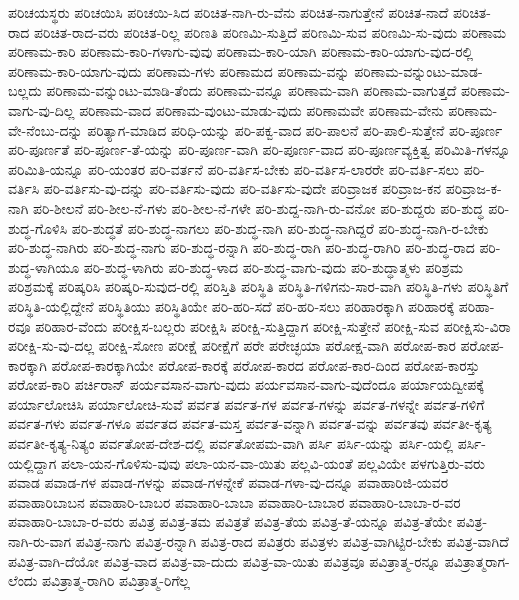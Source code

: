 {ಪರಿಚಯಸ್ಥರು
ಪರಿಚಯಿಸಿ
ಪರಿಚಯಿ-ಸಿದ
ಪರಿಚಿತ-ನಾಗಿ-ರು-ವೆನು
ಪರಿಚಿತ-ನಾಗುತ್ತೇನೆ
ಪರಿಚಿತ-ನಾದೆ
ಪರಿಚಿತ-ರಾದ
ಪರಿಚಿತ-ರಾದ-ವರು
ಪರಿಚಿತ-ರಿಲ್ಲ
ಪರಿಣತಿ
ಪರಿಣಮಿ-ಸುತ್ತಿದೆ
ಪರಿಣಮಿ-ಸುವ
ಪರಿಣಮಿ-ಸು-ವುದು
ಪರಿಣಾಮ
ಪರಿಣಾಮ-ಕಾರಿ
ಪರಿಣಾಮ-ಕಾರಿ-ಗಳಾಗು-ವುವು
ಪರಿಣಾಮ-ಕಾರಿ-ಯಾಗಿ
ಪರಿಣಾಮ-ಕಾರಿ-ಯಾಗು-ವುದ-ರಲ್ಲಿ
ಪರಿಣಾಮ-ಕಾರಿ-ಯಾಗು-ವುದು
ಪರಿಣಾಮ-ಗಳು
ಪರಿಣಾಮದ
ಪರಿಣಾಮ-ವನ್ನು
ಪರಿಣಾಮ-ವನ್ನುಂಟು-ಮಾಡ-ಬಲ್ಲದು
ಪರಿಣಾಮ-ವನ್ನುಂಟು-ಮಾಡಿ-ತೆಂದು
ಪರಿಣಾಮ-ವನ್ನೂ
ಪರಿಣಾಮ-ವಾಗಿ
ಪರಿಣಾಮ-ವಾಗುತ್ತದೆ
ಪರಿಣಾಮ-ವಾಗು-ವು-ದಿಲ್ಲ
ಪರಿಣಾಮ-ವಾದ
ಪರಿಣಾಮ-ವುಂಟು-ಮಾಡು-ವುದು
ಪರಿಣಾಮವೇ
ಪರಿಣಾಮ-ವೇನು
ಪರಿಣಾಮ-ವೇ-ನೆಂಬು-ದನ್ನು
ಪರಿತ್ಯಾಗ-ಮಾಡಿದ
ಪರಿಧಿ-ಯನ್ನು
ಪರಿ-ಪಕ್ವ-ವಾದ
ಪರಿ-ಪಾಲನೆ
ಪರಿ-ಪಾಲಿ-ಸುತ್ತೇನೆ
ಪರಿ-ಪೂರ್ಣ
ಪರಿ-ಪೂರ್ಣತೆ
ಪರಿ-ಪೂರ್ಣ-ತೆ-ಯನ್ನು
ಪರಿ-ಪೂರ್ಣ-ವಾಗಿ
ಪರಿ-ಪೂರ್ಣ-ವಾದ
ಪರಿ-ಪೂರ್ಣವ್ಯಕ್ತಿತ್ವ
ಪರಿಮಿತಿ-ಗಳನ್ನೂ
ಪರಿಮಿತಿ-ಯನ್ನೂ
ಪರಿ-ಯಂತರ
ಪರಿ-ವರ್ತನೆ
ಪರಿ-ವರ್ತಿಸ-ಬೇಕು
ಪರಿ-ವರ್ತಿಸ-ಲಾರರೇ
ಪರಿ-ವರ್ತಿ-ಸಲು
ಪರಿ-ವರ್ತಿಸಿ
ಪರಿ-ವರ್ತಿಸು-ವು-ದನ್ನು
ಪರಿ-ವರ್ತಿಸು-ವುದು
ಪರಿ-ವರ್ತಿಸು-ವುದೇ
ಪರಿವ್ರಾಜಕ
ಪರಿವ್ರಾಜ-ಕನ
ಪರಿವ್ರಾಜ-ಕ-ನಾಗಿ
ಪರಿ-ಶೀಲನೆ
ಪರಿ-ಶೀಲ-ನೆ-ಗಳು
ಪರಿ-ಶೀಲ-ನೆ-ಗಳೇ
ಪರಿ-ಶುದ್ದ-ನಾಗಿ-ರು-ವನೋ
ಪರಿ-ಶುದ್ದರು
ಪರಿ-ಶುದ್ಧ
ಪರಿ-ಶುದ್ಧ-ಗೊಳಿಸಿ
ಪರಿ-ಶುದ್ಧತೆ
ಪರಿ-ಶುದ್ಧ-ನಾಗಲು
ಪರಿ-ಶುದ್ಧ-ನಾಗಿ
ಪರಿ-ಶುದ್ಧ-ನಾಗಿದ್ದರೆ
ಪರಿ-ಶುದ್ಧ-ನಾಗಿ-ರ-ಬೇಕು
ಪರಿ-ಶುದ್ಧ-ನಾಗಿರು
ಪರಿ-ಶುದ್ಧ-ನಾಗು
ಪರಿ-ಶುದ್ಧ-ರನ್ನಾಗಿ
ಪರಿ-ಶುದ್ಧ-ರಾಗಿ
ಪರಿ-ಶುದ್ಧ-ರಾಗಿರಿ
ಪರಿ-ಶುದ್ಧ-ರಾದ
ಪರಿ-ಶುದ್ಧ-ಳಾಗಿಯೂ
ಪರಿ-ಶುದ್ಧ-ಳಾಗಿರು
ಪರಿ-ಶುದ್ಧ-ಳಾದ
ಪರಿ-ಶುದ್ಧ-ವಾಗು-ವುದು
ಪರಿ-ಶುದ್ಧಾತ್ಮಳು
ಪರಿಶ್ರಮ
ಪರಿಶ್ರಮಕ್ಕೆ
ಪರಿಷ್ಕರಿಸಿ
ಪರಿಷ್ಕರಿ-ಸುವುದ-ರಲ್ಲಿ
ಪರಿಸ್ತಿತಿ
ಪರಿಸ್ಥಿತಿ
ಪರಿಸ್ಥಿತಿ-ಗಳಿಗನು-ಸಾರ-ವಾಗಿ
ಪರಿಸ್ಥಿತಿ-ಗಳು
ಪರಿಸ್ಥಿತಿಗೆ
ಪರಿಸ್ಥಿತಿ-ಯಲ್ಲಿದ್ದೇನೆ
ಪರಿಸ್ಥಿತಿಯು
ಪರಿಸ್ಥಿತಿಯೇ
ಪರಿ-ಹರಿ-ಸದೆ
ಪರಿ-ಹರಿ-ಸಲು
ಪರಿಹಾರಕ್ಕಾಗಿ
ಪರಿಹಾರಕ್ಕೆ
ಪರಿಹಾ-ರವೂ
ಪರಿಹಾರ-ವೆಂದು
ಪರೀಕ್ಷಿಸ-ಬಲ್ಲರು
ಪರೀಕ್ಷಿಸಿ
ಪರೀಕ್ಷಿ-ಸುತ್ತಿದ್ದಾಗ
ಪರೀಕ್ಷಿ-ಸುತ್ತೇನೆ
ಪರೀಕ್ಷಿ-ಸುವ
ಪರೀಕ್ಷಿಸು-ವಿರಾ
ಪರೀಕ್ಷಿ-ಸು-ವು-ದಲ್ಲ
ಪರೀಕ್ಷಿ-ಸೋಣ
ಪರೀಕ್ಷೆ
ಪರೀಕ್ಷೆಗೆ
ಪರೇ
ಪರೇಚ್ಛಯಾ
ಪರೋಕ್ಷ-ವಾಗಿ
ಪರೋಪ-ಕಾರ
ಪರೋಪ-ಕಾರಕ್ಕಾಗಿ
ಪರೋಪ-ಕಾರಕ್ಕಾಗಿಯೇ
ಪರೋಪ-ಕಾರಕ್ಕೆ
ಪರೋಪ-ಕಾರದ
ಪರೋಪ-ಕಾರ-ದಿಂದ
ಪರೋಪ-ಕಾರಸ್ತು
ಪರೋಪ-ಕಾರಿ
ಪರ್ಚಿರಾನ್
ಪರ್ಯವಸಾನ-ವಾಗು-ವುದು
ಪರ್ಯವಸಾನ-ವಾಗು-ವುದೆಂದೂ
ಪರ್ಯಾಯದ್ವೀಪಕ್ಕೆ
ಪರ್ಯಾಲೋಚಿಸಿ
ಪರ್ಯಾಲೋಚಿ-ಸುವೆ
ಪರ್ವತ
ಪರ್ವತ-ಗಳ
ಪರ್ವತ-ಗಳನ್ನು
ಪರ್ವತ-ಗಳನ್ನೇ
ಪರ್ವತ-ಗಳಿಗೆ
ಪರ್ವತ-ಗಳು
ಪರ್ವತ-ಗಳೂ
ಪರ್ವತದ
ಪರ್ವತ-ಮಸ್ತ
ಪರ್ವತ-ವನ್ನಾಗಿ
ಪರ್ವತ-ವನ್ನು
ಪರ್ವತವು
ಪರ್ವತೀ-ಕೃತ್ಯ
ಪರ್ವತೀ-ಕೃತ್ಯ-ನಿತ್ಯಂ
ಪರ್ವತೋಪ-ದೇಶ-ದಲ್ಲಿ
ಪರ್ವತೋಪಮ-ವಾಗಿ
ಪರ್ಸಿ
ಪರ್ಸಿ-ಯನ್ನು
ಪರ್ಸಿ-ಯಲ್ಲಿ
ಪರ್ಸಿ-ಯಲ್ಲಿದ್ದಾಗ
ಪಲಾ-ಯನ-ಗೊಳಿಸು-ವುವು
ಪಲಾ-ಯನ-ವಾ-ಯಿತು
ಪಲ್ಲವಿ-ಯಂತೆ
ಪಲ್ಲವಿಯೇ
ಪಳಗುತ್ತಿರು-ವರು
ಪವಾಡ
ಪವಾಡ-ಗಳ
ಪವಾಡ-ಗಳನ್ನು
ಪವಾಡ-ಗಳನ್ನೇಕೆ
ಪವಾಡ-ಗಳಾ-ವು-ದನ್ನೂ
ಪವಾಹಾರಿಜಿ-ಯವರ
ಪವಾಹಾರಿಬಾಬನ
ಪವಾಹಾರಿ-ಬಾಬರ
ಪವಾಹಾರಿ-ಬಾಬಾ
ಪವಾಹಾರಿ-ಬಾಬಾರ
ಪವಾಹಾರಿ-ಬಾಬಾ-ರ-ವರ
ಪವಾಹಾರಿ-ಬಾಬಾ-ರ-ವರು
ಪವಿತ್ರ
ಪವಿತ್ರ-ತಮ
ಪವಿತ್ರತೆ
ಪವಿತ್ರ-ತೆಯ
ಪವಿತ್ರ-ತೆ-ಯನ್ನೂ
ಪವಿತ್ರ-ತೆಯೇ
ಪವಿತ್ರ-ನಾಗಿ-ರು-ವಾಗ
ಪವಿತ್ರ-ನಾಗು
ಪವಿತ್ರ-ರನ್ನಾಗಿ
ಪವಿತ್ರ-ರಾದ
ಪವಿತ್ರರು
ಪವಿತ್ರಳು
ಪವಿತ್ರ-ವಾಗಿಟ್ಟಿರ-ಬೇಕು
ಪವಿತ್ರ-ವಾಗಿದೆ
ಪವಿತ್ರ-ವಾಗಿ-ದೆಯೋ
ಪವಿತ್ರ-ವಾದ
ಪವಿತ್ರ-ವಾ-ದುದು
ಪವಿತ್ರ-ವಾ-ಯಿತು
ಪವಿತ್ರವೂ
ಪವಿತ್ರಾತ್ಮ-ರನ್ನೂ
ಪವಿತ್ರಾತ್ಮರಾಗ-ಲೆಂದು
ಪವಿತ್ರಾತ್ಮ-ರಾಗಿರಿ
ಪವಿತ್ರಾತ್ಮ-ರಿಗೆಲ್ಲ
}
